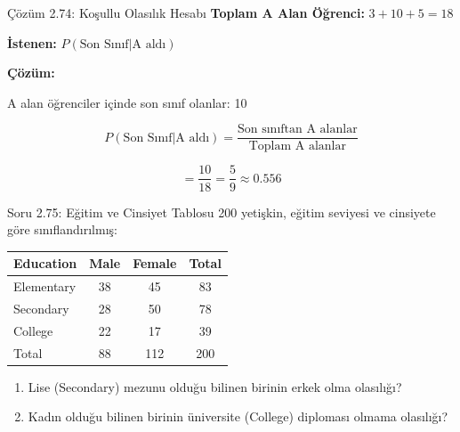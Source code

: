 \documentclass[light]{lutbeamer}
\begin{document}
\begin{frame}{Çözüm 2.74: Koşullu Olasılık Hesabı}
    \color{blue}
    \textbf{Toplam A Alan Öğrenci:} $3 + 10 + 5 = 18$
    
    \vspace{0.3cm}
    \textbf{İstenen:} $P(\text{Son Sınıf} | \text{A aldı})$
    
    \vspace{0.3cm}
    \textbf{Çözüm:}
    
    A alan öğrenciler içinde son sınıf olanlar: 10
    
    \[ P(\text{Son Sınıf} | \text{A aldı}) = \frac{\text{Son sınıftan A alanlar}}{\text{Toplam A alanlar}} \]
    
    \[ = \frac{10}{18} = \frac{5}{9} \approx 0.556 \]
    
    \begin{center}
    \end{center}
\end{frame}

\begin{frame}{Soru 2.75: Eğitim ve Cinsiyet Tablosu}
    200 yetişkin, eğitim seviyesi ve cinsiyete göre sınıflandırılmış:
    
    \begin{center}
    \footnotesize
    \begin{tabular}{lccc}
        \toprule
        Education & Male & Female & Total \\
        \midrule
        Elementary & 38 & 45 & 83 \\
        Secondary  & 28 & 50 & 78 \\
        College    & 22 & 17 & 39 \\
        \midrule
        Total & 88 & 112 & 200 \\
        \bottomrule
    \end{tabular}
    \end{center}
    
    \begin{enumerate}
        \item Lise (Secondary) mezunu olduğu bilinen birinin erkek olma olasılığı?
        \item Kadın olduğu bilinen birinin üniversite (College) diploması olmama olasılığı?
    \end{enumerate}
\end{frame}
\end{document}
